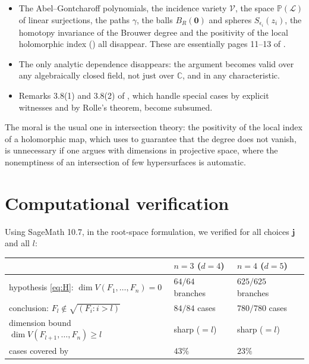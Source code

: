 \documentclass[11pt,reqno]{amsart}
\theoremstyle{plain}
\theoremstyle{definition}
\newcommand{\PP}{\mathbb{P}}
\newcommand{\bj}{\mathbf{j}}
\begin{document}
\begin{itemize}
\item The Abel--Gontcharoff polynomials, the incidence variety $\mathcal V$, the
  space $\PP(\mathcal L)$ of linear surjections, the paths $\gamma$, the balls
  $B_R(\mathbf 0)$ and spheres $S_{\epsilon_i}(z_i)$, the homotopy invariance of
  the Brouwer degree and the positivity of the local holomorphic index
  (\cite[Part I, §5.4]{AGZV}) all disappear. These are essentially pages 11--13
  of \cite{Gho}.
\item The only analytic dependence disappears: the argument becomes valid over
  any algebraically closed field, not just over $\mathbb{C}$, and in any
  characteristic.
\item Remarks 3.8(1) and 3.8(2) of \cite{Gho}, which handle special cases by
  explicit witnesses and by Rolle's theorem, become subsumed.
\end{itemize}

The moral is the usual one in intersection theory: the positivity of the local
index of a holomorphic map, which \cite{Gho} uses to guarantee that the degree
does not vanish, is unnecessary if one argues with dimensions in projective
space, where the nonemptiness of an intersection of few hypersurfaces is
automatic.

\section{Computational verification}

Using SageMath 10.7, in the root-space formulation, we verified for all choices
$\bj$ and all $l$:

\begin{center}
\renewcommand{\arraystretch}{1.2}
\begin{tabular}{>{\raggedright\arraybackslash}p{}%
                >{\raggedright\arraybackslash}p{}%
                >{\raggedright\arraybackslash}p{}}
\toprule
 & $n=3$ ($d=4$) & $n=4$ ($d=5$)\\
\midrule
hypothesis \eqref{eq:H}: $\dim V(F_1,\dots,F_n)=0$ & $64/64$ branches & $625/625$ branches\\
conclusion: $F_l\notin\sqrt{(F_i:i>l)}$ & $84/84$ cases & $780/780$ cases\\
dimension bound $\dim V(F_{l+1},\dots,F_n)\ge l$ & sharp ($=l$) & sharp ($=l$)\\
cases covered by \cite[Rmk.~3.8(1)]{Gho} & $43\%$ & $23\%$\\
\bottomrule
\end{tabular}
\end{center}
\end{document}
